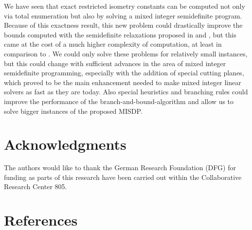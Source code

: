 \documentclass[a4paper,11pt,1p]{elsarticle}
\begin{document}
We have seen that exact restricted isometry constants can be computed not only via total enumeration but also by solving a mixed integer semidefinite program. Because of this exactness result, this new problem could drastically
improve the bounds computed with the semidefinite relaxations proposed in \cite{Asp07} and \cite{Asp08}, but this came at the cost of a much higher complexity of computation, at least in comparison to \cite{Asp07}. We could only 
solve these problems for relatively small instances, but this could change with sufficient advances in the area of mixed integer semidefinite programming, especially with the addition of special cutting planes, which proved to be 
the main enhancement needed to make mixed integer linear solvers as fast as they are today. Also special heuristics and branching rules could improve the performance of the branch-and-bound-algorithm and allow us to solve bigger 
instances of the proposed MISDP.

\section*{Acknowledgments}
The authors would like to thank the German Research Foundation (DFG) for funding as parts of this research have been carried out within the Collaborative Research Center 805.

\section*{References}


\end{document}
